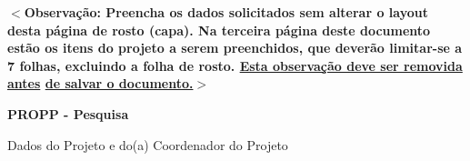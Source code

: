 \documentclass[a4paper,11pt]{article}
\begin{document}


\noindent\textbf{$<$Observação: Preencha os dados solicitados sem alterar o layout desta página de rosto (capa). Na terceira página deste documento estão os itens do projeto a serem preenchidos, que deverão limitar-se a 7 folhas, excluindo a folha de rosto. {\color{red} \underline{Esta observação deve ser removida antes} \underline{de salvar o documento.}}$>$}

\vspace{1cm}

\begin{huge}
{\centering\textbf{PROPP - Pesquisa}\par}
\end{huge}

\vspace{1cm}

\begin{Large}
{\centering Dados do Projeto e do(a) Coordenador do Projeto\par}
\end{Large}

\end{document}
